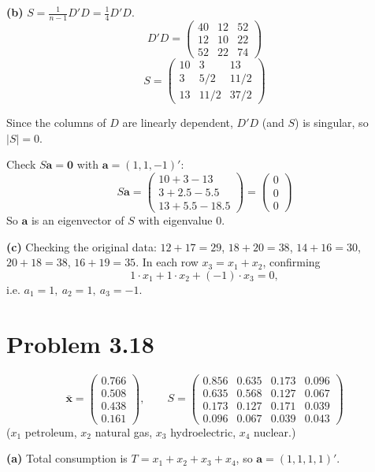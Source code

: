 \documentclass[11pt]{article}
\begin{document}
\textbf{(b)} $S=\frac1{n-1}D'D=\frac14 D'D$.
\[
D'D=\begin{pmatrix}
40 & 12 & 52\\
12 & 10 & 22\\
52 & 22 & 74
\end{pmatrix}
\]
\[
S=\boxed{\begin{pmatrix}
10 & 3 & 13\\
3 & 5/2 & 11/2\\
13 & 11/2 & 37/2
\end{pmatrix}}
\]

Since the columns of $D$ are linearly dependent, $D'D$ (and $S$) is singular, so
$|S|=\boxed{0}$.

Check $S\mathbf a=\mathbf 0$ with $\mathbf a=(1,1,-1)'$:
\[
S\mathbf a=
\begin{pmatrix}
10+3-13\\
3+2.5-5.5\\
13+5.5-18.5
\end{pmatrix}
=\begin{pmatrix}0\\0\\0\end{pmatrix}
\]
So $\mathbf a$ is an eigenvector of $S$ with eigenvalue $0$.

\textbf{(c)} Checking the original data: $12+17=29$, $18+20=38$, $14+16=30$, $20+18=38$,
$16+19=35$. In each row $x_3=x_1+x_2$, confirming
\[
1\cdot x_1+1\cdot x_2+(-1)\cdot x_3=0,
\]
i.e. $a_1=1,\ a_2=1,\ a_3=-1$.

\newpage
\section*{Problem 3.18}

\[
\bar{\mathbf x}=\begin{pmatrix}0.766\\0.508\\0.438\\0.161\end{pmatrix},\qquad
S=\begin{pmatrix}
0.856 & 0.635 & 0.173 & 0.096\\
0.635 & 0.568 & 0.127 & 0.067\\
0.173 & 0.127 & 0.171 & 0.039\\
0.096 & 0.067 & 0.039 & 0.043
\end{pmatrix}
\]
($x_1$ petroleum, $x_2$ natural gas, $x_3$ hydroelectric, $x_4$ nuclear.)

\textbf{(a)} Total consumption is $T=x_1+x_2+x_3+x_4$, so $\mathbf a=(1,1,1,1)'$.
\end{document}
